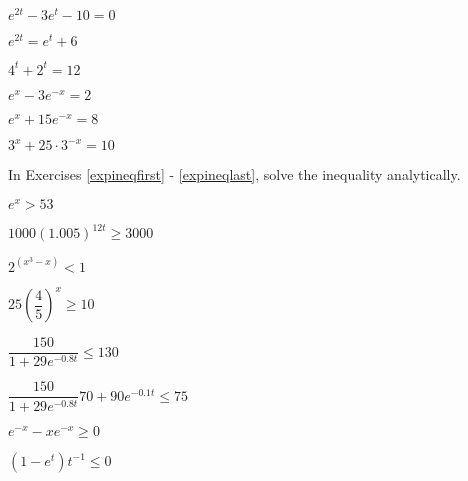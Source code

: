 \documentclass{ximera}
\begin{document}
\begin{question}
\begin{problem}
$e^{2t} - 3e^{t}-10=0$ 
\end{problem}  

\begin{problem}
$e^{2t} = e^{t}+6$ %
\end{problem} 

\begin{problem}
$4^{t} + 2^{t} = 12$ %
\end{problem}  

\begin{problem}
$e^{x}-3e^{-x}=2$ %
\end{problem}

\begin{problem}
$e^{x}+15e^{-x}=8$ %
\end{problem} 

\begin{problem}\label{expeqnlast}
$3^{x}+25\cdot3^{-x}=10$ %
\end{problem} 
\end{question}

\begin{question}
In Exercises \ref{expineqfirst} - \ref{expineqlast}, solve the inequality analytically.

\begin{problem}\label{expineqfirst}
$e^{x} > 53$
\end{problem}   

\begin{problem}
$1000\left(1.005\right)^{12t} \geq 3000$
\end{problem} 

\begin{problem}
$2^{(x^{3} - x)} < 1$
\end{problem}  

\begin{problem}
$25\left(\dfrac{4}{5}\right)^{x} \geq 10$
\end{problem}   

\begin{problem}
$\dfrac{150}{1 + 29e^{-0.8t}} \leq 130$
\end{problem} 

\begin{problem}
$\dfrac{150}{1 + 29e^{-0.8t}} 70 + 90e^{-0.1t} \leq 75$
\end{problem}  

\begin{problem}
$e^{-x} - xe^{-x} \geq 0$
\end{problem}   

\begin{problem}\label{expineqlast}
$(1-e^{t}) t^{-1} \leq 0$
\end{problem}  

\end{question}
\end{document}
